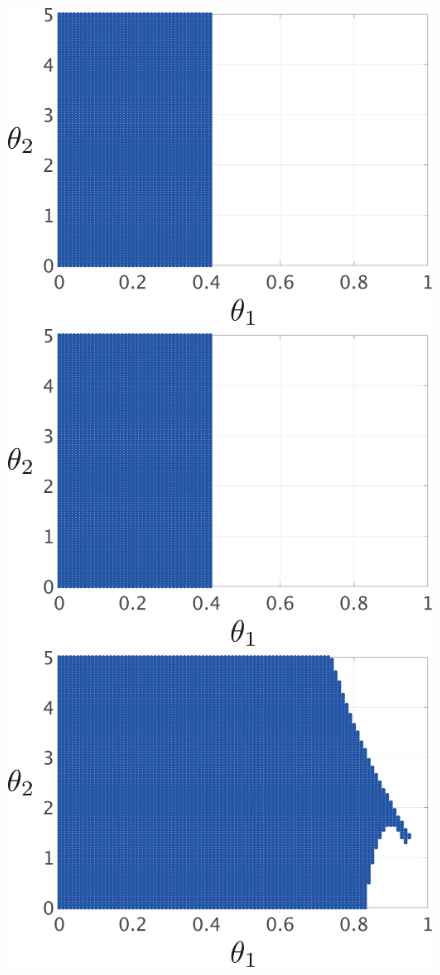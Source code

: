 \documentclass[tombow,dvipdfmx]{corona-a5-1.1}
\begin{document}
\begin{figure}[t!]
  \centering
  {
  \begin{minipage}{0.49\linewidth}
    \centering
    \includegraphics[width = 0.90\linewidth]{figs/Y1D1}
    \medskip
  \end{minipage}
  \begin{minipage}{0.49\linewidth}
    \centering
    \includegraphics[width = 0.90\linewidth]{figs/Y1D0.01}
    \medskip
  \end{minipage}
}
  \centering
  {
  \begin{minipage}{0.49\linewidth}
      \centering
    \includegraphics[width = 0.90\linewidth]{figs/Y0.01D1}

\end{minipage}}
\end{figure}
\end{document}
